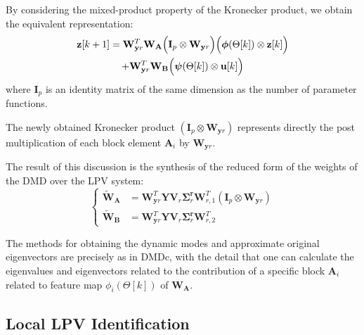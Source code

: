 By considering the mixed-product property of the Kronecker product, we obtain the equivalent representation:
\begin{multline}
\mathbf{z}[k+1] = \mathbf{W}_{\mathbf{y}r}^T\mathbf{W_A}\Bigl(\mathbf{I}_p \otimes \mathbf{W}_{\mathbf{y}r}\Bigr)\Bigl(\boldsymbol{\phi}(\Theta[k]) \otimes \mathbf{z}[k]\Bigr) 
  \\ + \mathbf{W}_{\mathbf{y}r}^T\mathbf{W_B}\Bigl(\boldsymbol{\psi}(\Theta[k]) \otimes \mathbf{u}[k]\Bigr)    
\end{multline}
where $\mathbf{I}_p$ is an identity matrix of the same dimension as the number of  parameter functions.


The newly obtained Kronecker product $(\mathbf{I}_p \otimes \mathbf{W}_{\mathbf{y}r})$ represents directly the post multiplication of each block element $\mathbf{A}_i$ by $\mathbf{W}_{\mathbf{y}r}$.

The result of this discussion is the synthesis of the reduced form of the weights of the DMD over the LPV system: 
\begin{equation}
\left \{
\begin{aligned} \label{eqn:dmdc_lpv}
    \widetilde{\mathbf{W}}_{\mathbf{A}} &= \mathbf{W}_{\mathbf{y}r}^T\mathbf{Y}\mathbf{V}_{r}\mathbf{\Sigma}_r^{\mathbf{r}}\mathbf{W}_{r,1}^T\left(\mathbf{I}_p \otimes \mathbf{W}_{\mathbf{y}r}\right)\\
    \widetilde{\mathbf{W}}_{\mathbf{B}} &= \mathbf{W}_{\mathbf{y}r}^T\mathbf{Y}\mathbf{V}_r\mathbf{\Sigma}_{r}^{\mathbf{r}}\mathbf{W}_{r,2}^T
\end{aligned}
  \right .
\end{equation}

The methods for obtaining the dynamic modes and approximate original eigenvectors are precisely as in DMDc, with the detail that one can calculate the eigenvalues and eigenvectors related to the contribution of a specific block $\mathbf{A}_i$ related to feature map $\phi_i(\Theta [k])$ of $\mathbf{W_A}$.


\subsection{Local LPV Identification}

